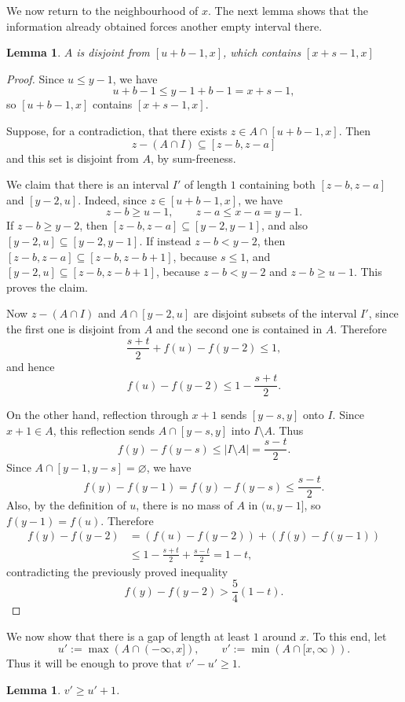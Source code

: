 \documentclass[11pt,reqno]{amsart}
\newtheorem{lem}[thm]{Lemma}
\theoremstyle{definition}
\def\F#1{f(#1)}
\begin{document}
We now return to the neighbourhood of $x$. The next lemma shows that the information already obtained forces another empty interval there.
\begin{lem}
    $A$ is disjoint from $[u+b-1,x]$, which contains $[x+s-1,x]$
\end{lem}
\begin{proof}
Since $u\leq y-1$, we have
$$
    u+b-1\leq y-1+b-1=x+s-1,
$$
so $[u+b-1,x]$ contains $[x+s-1,x]$.

Suppose, for a contradiction, that there exists
$z\in A\cap[u+b-1,x]$. Then
$$
    z-(A\cap I)\subseteq [z-b,z-a]
$$
and this set is disjoint from $A$, by sum-freeness.

We claim that there is an interval $I'$ of length $1$ containing both
$[z-b,z-a]$ and $[y-2,u]$. Indeed, since $z\in[u+b-1,x]$, we have
$$
    z-b\geq u-1,
    \qquad
    z-a\leq x-a=y-1.
$$
If $z-b\geq y-2$, then $[z-b,z-a]\subseteq[y-2,y-1]$, and also
$[y-2,u]\subseteq[y-2,y-1]$. If instead $z-b<y-2$, then
$[z-b,z-a]\subseteq[z-b,z-b+1]$, because $s\leq1$, and
$[y-2,u]\subseteq[z-b,z-b+1]$, because $z-b<y-2$ and $z-b\geq u-1$.
This proves the claim.

Now $z-(A\cap I)$ and $A\cap[y-2,u]$ are disjoint subsets of the interval
$I'$, since the first one is disjoint from $A$ and the second one is contained
in $A$. Therefore
$$
    \frac{s+t}{2}+\F{u}-\F{y-2}\leq 1,
$$
and hence
$$
    \F{u}-\F{y-2}\leq 1-\frac{s+t}{2}.
$$

On the other hand, reflection through $x+1$ sends $[y-s,y]$ onto $I$.
Since $x+1\in A$, this reflection sends $A\cap[y-s,y]$ into $I\setminus A$.
Thus
$$
    \F{y}-\F{y-s}\leq |I\setminus A|=\frac{s-t}{2}.
$$
Since $A\cap[y-1,y-s]=\varnothing$, we have
$$
    \F{y}-\F{y-1}=\F{y}-\F{y-s}\leq \frac{s-t}{2}.
$$
Also, by the definition of $u$, there is no mass of $A$ in $(u,y-1]$, so
$\F{y-1}=\F{u}$. Therefore
$$
\begin{aligned}
    \F{y}-\F{y-2}
    &=
    (\F{u}-\F{y-2})+(\F{y}-\F{y-1})  \\
    &\leq
    1-\frac{s+t}{2}+\frac{s-t}{2}
    =
    1-t,
\end{aligned}
$$
contradicting the previously proved inequality
$$
    \F{y}-\F{y-2}>\frac{5}{4}(1-t).
$$
\end{proof}
We now show that there is a gap of length at least $1$ around $x$. To this end, let
$$
u':=\max(A\cap(-\infty,x]),\qquad v':=\min(A\cap[x,\infty)).
$$
Thus it will be enough to prove that $v'-u'\geq 1$.
\begin{lem}
    $v'\geq u' + 1$. 
\end{lem}
\end{document}
